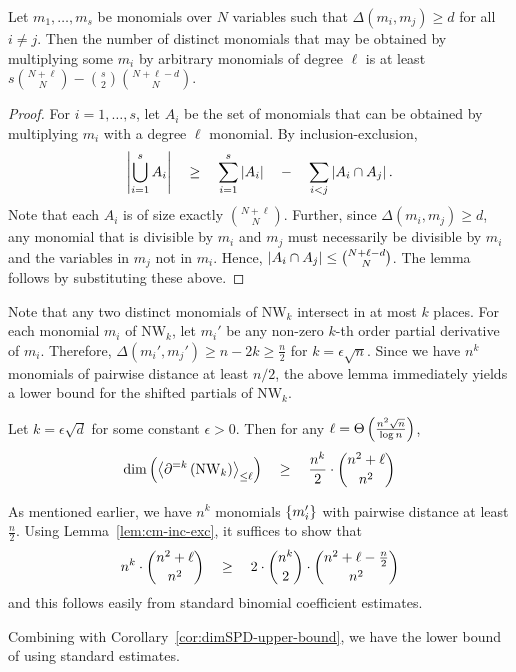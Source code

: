 \begin{lemma}[\cite{cm14}]\label{lem:cm-inc-exc}
Let $m_1,\dots, m_s$ be monomials over $N$ variables such that $\Delta(m_i, m_j) \geq d$ for all $i\neq j$. Then the number of distinct monomials that may be obtained by multiplying some $m_i$ by arbitrary monomials of degree $\ell$ is at least $s \binom{N+\ell}{N} - \binom{s}{2} \binom{N+\ell - d}{N}$. 
\end{lemma}
\begin{proof}
For $i = 1,\dots, s$, let $A_i$ be the set of monomials that can be obtained by multiplying $m_i$ with a degree $\ell$ monomial. By inclusion-exclusion, 
$$
\left|\bigcup_{i=1}^s A_i\right| \quad \geq \quad \sum_{i=1}^s \left|A_i\right| \quad - \quad \sum_{i<j} \left|A_i \cap A_j\right|.
$$
Note that each $A_i$ is of size exactly $\binom{N+\ell}{N}$. Further, since $\Delta(m_i, m_j) \geq d$, any monomial that is divisible by $m_i$ and $m_j$ must necessarily be divisible by $m_i$ and the variables in $m_j$ not in $m_i$. Hence, $\left|A_i\cap A_j\right| \leq \binom{N + \ell - d}{N}$. The lemma follows by substituting these above. 
\end{proof}

Note that any two distinct monomials of $\mathrm{NW}_k$ intersect in at most $k$ places. For each monomial $m_i$ of $\mathrm{NW}_k$, let $m_i'$ be any non-zero $k$-th order partial derivative of $m_i$. Therefore, $\Delta(m_i', m_j') \geq n -2k \geq \frac{n}{2}$ for $k = \epsilon \sqrt{n}$. Since we have $n^k$ monomials of pairwise distance at least $n/2$, the above lemma immediately yields a lower bound for the shifted partials of $\mathrm{NW}_k$. 

\begin{theorem}
Let $k = \epsilon \sqrt{d}$ for some constant $\epsilon > 0$. Then for any  $\ell = \Theta\left(\frac{n^2 \sqrt{n}}{\log n}\right)$,
$$
\dim\left(\left\langle\partial^{=k}\left(\mathrm{NW}_k\right)\right\rangle_{\leq \ell}\right) \quad \geq \quad \frac{n^k}{2} \cdot \binom{n^2 + \ell}{n^2}
$$
\end{theorem}
\begin{proof-sketch}
As mentioned earlier, we have $n^k$ monomials $\left\{m_i'\right\}$ with pairwise distance at least $\frac{n}{2}$. Using Lemma~\ref{lem:cm-inc-exc}, it suffices to show that
$$
n^k \cdot \binom{n^2 + \ell}{n^2} \quad \geq \quad 2 \cdot \binom{n^k}{2} \cdot \binom{n^2 + \ell - \frac{n}{2}}{n^2}
$$
and this follows easily from standard binomial coefficient estimates. 
\end{proof-sketch}

Combining with Corollary~\ref{cor:dimSPD-upper-bound}, we have the lower bound of \cite{KSS13} using standard estimates. 

